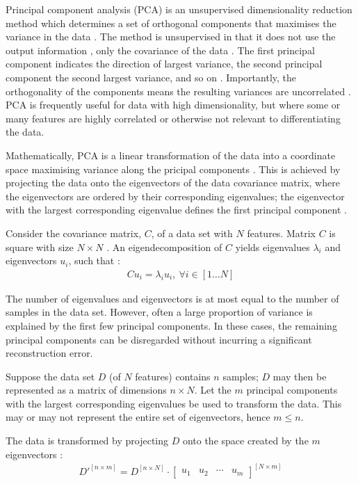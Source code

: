Principal component analysis (PCA) is an unsupervised dimensionality reduction method which determines a set of orthogonal components that maximises the variance in the data \cite{alpaydin_2020} \cite{lovell_2008}. The method is unsupervised in that it does not use the output information \cite{alpaydin_2020}, only the covariance of the data \cite{lovell_2008}. The first principal component indicates the direction of largest variance, the second principal component the second largest variance, and so on \cite{alpaydin_2020}. Importantly, the orthogonality of the components means the resulting variances are uncorrelated \cite{alpaydin_2020}. PCA is frequently useful for data with high dimensionality, but where some or many features are highly correlated or otherwise not relevant to differentiating the data.

Mathematically, PCA is a linear transformation of the data into a coordinate space maximising variance along the pricipal components \cite{jolliffe_2002}. This is achieved by projecting the data onto the eigenvectors of the data covariance matrix, where the eigenvectors are ordered by their corresponding eigenvalues; the eigenvector with the largest corresponding eigenvalue defines the first principal component \cite{rosebrock_2021}.

Consider the covariance matrix, $C$, of a data set with $N$ features. Matrix $C$ is square with size $N\times N$ \cite{lovell_2008}. An eigendecomposition of $C$ yields eigenvalues $\lambda_i$ and eigenvectors $u_i$, such that \cite{lovell_2008}:
\begin{align}
  C u_i = \lambda_i u_i,\ \forall i \in [1 \ldots N]
\end{align}

The number of eigenvalues and eigenvectors is at most equal to the number of samples in the data set. However, often a large proportion of variance is explained by the first few principal components. In these cases, the remaining principal components can be disregarded without incurring a significant reconstruction error.

Suppose the data set $D$ (of $N$ features) contains $n$ samples; $D$ may then be represented as a matrix of dimensions $n\times N$. Let the $m$ principal components with the largest corresponding eigenvalues be used to transform the data. This may or may not represent the entire set of eigenvectors, hence $m\leq n$.

The data is transformed by projecting $D$ onto the space created by the $m$ eigenvectors \cite{rosebrock_2021}:
\begin{align}
  D'^{[n\times m]} = D^{[n\times N]} \cdot \begin{bmatrix} u_1 & u_2 & \cdots & u_m \end{bmatrix}^{[N\times m]}
\end{align}


